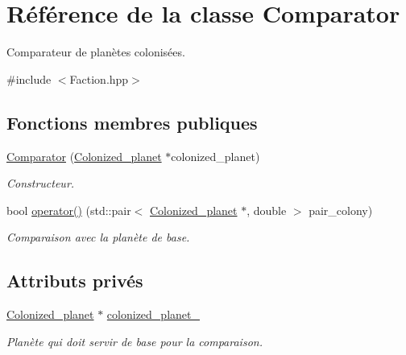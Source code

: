 \hypertarget{classComparator}{\section{Référence de la classe Comparator}
\label{classComparator}
}


Comparateur de planètes colonisées.  




{\ttfamily \#include $<$Faction.\-hpp$>$}

\subsection*{Fonctions membres publiques}
\begin{DoxyCompactItemize}
\item 
\hyperlink{classComparator_aff716639b83e77e710f3c3175c4b43d0}{Comparator} (\hyperlink{classColonized__planet}{Colonized\-\_\-planet} $\ast$colonized\-\_\-planet)
\begin{DoxyCompactList}\small\item\em Constructeur. \end{DoxyCompactList}\item 
bool \hyperlink{classComparator_aa063882ba2357118b02cd4e01d807480}{operator()} (std\-::pair$<$ \hyperlink{classColonized__planet}{Colonized\-\_\-planet} $\ast$, double $>$ pair\-\_\-colony)
\begin{DoxyCompactList}\small\item\em Comparaison avec la planète de base. \end{DoxyCompactList}\end{DoxyCompactItemize}
\subsection*{Attributs privés}
\begin{DoxyCompactItemize}
\item 
\hypertarget{classComparator_a5b42c2a1661147200983835ac36802cf}{\hyperlink{classColonized__planet}{Colonized\-\_\-planet} $\ast$ \hyperlink{classComparator_a5b42c2a1661147200983835ac36802cf}{colonized\-\_\-planet\-\_\-}}\label{classComparator_a5b42c2a1661147200983835ac36802cf}

\begin{DoxyCompactList}\small\item\em Planète qui doit servir de base pour la comparaison. \end{DoxyCompactList}\end{DoxyCompactItemize}


